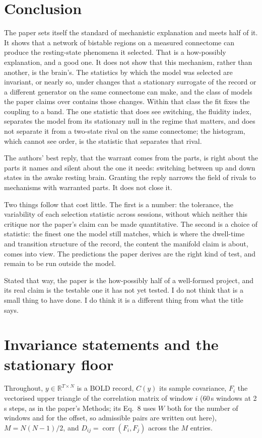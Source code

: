 \documentclass[11pt]{article}
\begin{document}
\section{Conclusion}
The paper sets itself the standard of mechanistic explanation and meets half of it. It shows that a network of bistable regions on a measured connectome can produce the resting-state phenomena it selected. That is a how-possibly explanation, and a good one. It does not show that this mechanism, rather than another, is the brain's. The statistics by which the model was selected are invariant, or nearly so, under changes that a stationary surrogate of the record or a different generator on the same connectome can make, and the class of models the paper claims over contains those changes. Within that class the fit fixes the coupling to a band. The one statistic that does see switching, the fluidity index, separates the model from its stationary null in the regime that matters, and does not separate it from a two-state rival on the same connectome; the histogram, which cannot see order, is the statistic that separates that rival.

The authors' best reply, that the warrant comes from the parts, is right about the parts it names and silent about the one it needs: switching between up and down states in the awake resting brain. Granting the reply narrows the field of rivals to mechanisms with warranted parts. It does not close it.

Two things follow that cost little. The first is a number: the tolerance, the variability of each selection statistic across sessions, without which neither this critique nor the paper's claim can be made quantitative. The second is a choice of statistic: the finest one the model still matches, which is where the dwell-time and transition structure of the record, the content the manifold claim is about, comes into view. The predictions the paper derives are the right kind of test, and remain to be run outside the model.

Stated that way, the paper is the how-possibly half of a well-formed project, and its real claim is the testable one it has not yet tested. I do not think that is a small thing to have done. I do think it is a different thing from what the title says.

\appendix
\section{Invariance statements and the stationary floor}
Throughout, $y\in\mathbb{R}^{T\times N}$ is a BOLD record, $C(y)$ its sample covariance, $F_i$ the vectorised upper triangle of the correlation matrix of window $i$ (60\,s windows at 2\,s steps, as in the paper's Methods; its Eq.~8 uses $W$ both for the number of windows and for the offset, so admissible pairs are written out here), $M=N(N-1)/2$, and $D_{ij}=\operatorname{corr}(F_i,F_j)$ across the $M$ entries.
\end{document}
